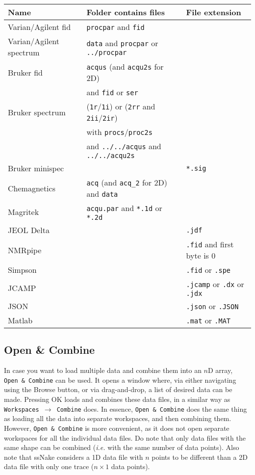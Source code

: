 \documentclass[11pt,a4paper]{article}
\begin{document}
\begin{center}
\begin{tabular}{lll}
\toprule
Name & Folder contains files & File extension\\
\midrule
\rowcolor{gray!30!white}
Varian/Agilent fid &  \texttt{procpar} and \texttt{fid} & \\
Varian/Agilent spectrum&  \texttt{data} and \texttt{procpar} or \texttt{../procpar} & \\
\rowcolor{gray!30!white}
Bruker fid &  \texttt{acqus} (and \texttt{acqu2s} for 2D)  &\\
\rowcolor{gray!30!white}
&and \texttt{fid} or \texttt{ser}&\\
Bruker spectrum & (\texttt{1r}/\texttt{1i}) or (\texttt{2rr} and \texttt{2ii}/\texttt{2ir}) &\\
  & with \texttt{procs}/\texttt{proc2s}  &\\
 &and \texttt{../../acqus} and \texttt{../../acqu2s} & \\
\rowcolor{gray!30!white}
Bruker minispec &  & \texttt{*.sig} \\
Chemagnetics &  \texttt{acq} (and \texttt{acq\_2} for 2D) and \texttt{data} &\\
\rowcolor{gray!30!white}
Magritek &  \texttt{acqu.par} and \texttt{*.1d} or \texttt{*.2d}&\\
JEOL Delta & & \texttt{.jdf}\\
\rowcolor{gray!30!white}
NMRpipe & & \texttt{.fid} and first byte is 0\\
Simpson &  & \texttt{.fid} or \texttt{.spe} \\
\rowcolor{gray!30!white}
JCAMP & & \texttt{.jcamp} or \texttt{.dx} or \texttt{.jdx}\\
JSON & & \texttt{.json} or \texttt{.JSON}\\
\rowcolor{gray!30!white}
Matlab & & \texttt{.mat} or \texttt{.MAT}\\
\bottomrule
\end{tabular}
\end{center}


\subsection{Open \& Combine}
In case you want to load multiple data and combine them into an $n$D array, \texttt{Open~\&~Combine} can be used. It opens a window where, via either navigating using the Browse button, or via drag-and-drop, a list of desired data can be made. Pressing OK loads and combines these data files, in a similar way as \texttt{Workspaces~$\rightarrow$~Combine} does. In essence, \texttt{Open~\&~Combine} does the same thing as loading all the data into separate workspaces, and then combining them. However, \texttt{Open~\&~Combine} is more convenient, as it does not open separate workspaces for all the individual data files. Do note that only data files with the same shape can be combined (\textit{i.e.} with the same number of data points). Also note that ssNake considers a 1D data file with $n$ points to be different than a 2D data file with only one trace ($n\times1$ data points).
\end{document}
